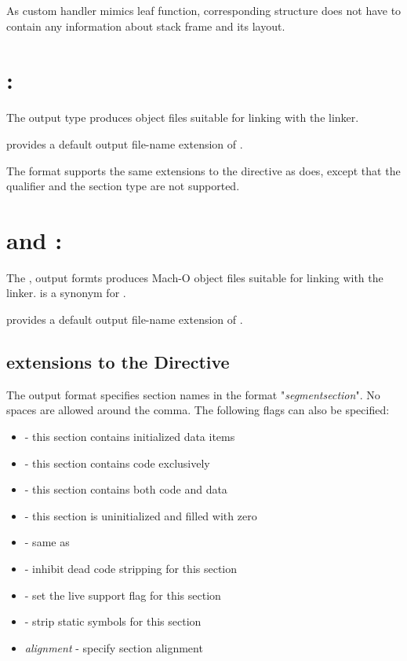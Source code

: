 As custom handler mimics leaf function, corresponding 
structure does not have to contain any information about stack frame
and its layout.

\section{: }
\label{sec:cofffmt}

The  output type produces  object files suitable for
linking with the  linker.

 provides a default output file-name extension of .

The  format supports the same extensions to the 
directive as  does, except that the  qualifier and
the  section type are not supported.

\section{ and :
}
\label{sec:machofmt}

The ,  output formts produces Mach-O
object files suitable for linking with the  linker.
 is a synonym for .

 provides a default output file-name extension of .

\subsection{ extensions to the  Directive}
\label{subsec:machosect}

The  output format specifies section names in the format
"\emph{segment}\code{,}\emph{section}". No spaces are allowed around the
comma. The following flags can also be specified:

\begin{itemize}
    \item{ - this section contains initialized data items}
    \item{ - this section contains code exclusively}
    \item{ - this section contains both code and data}
    \item{ - this section is uninitialized and filled with zero}
    \item{ - same as }
    \item{ - inhibit dead code stripping for this section}
    \item{ - set the live support flag for this section}
    \item{ - strip static symbols for this section}
    \item{\emph{alignment} - specify section alignment}
\end{itemize}

